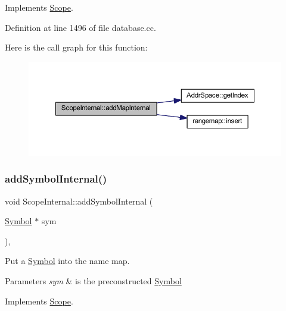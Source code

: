 Implements \mbox{\hyperlink{class_scope_aec0451f131ea214a174e00a434be36e9}{Scope}}.



Definition at line 1496 of file database.\+cc.

Here is the call graph for this function\+:
\nopagebreak
\begin{figure}[H]
\begin{center}
\leavevmode
\includegraphics[width=350pt]{class_scope_internal_a3b6e20fcb0624056020f2fc20d0a06ee_cgraph}
\end{center}
\end{figure}
\mbox{\label{class_scope_internal_af252bcb614abeea3af1750442087304a}} 
\subsubsection{\texorpdfstring{addSymbolInternal()}{addSymbolInternal()}}
{\footnotesize\ttfamily void Scope\+Internal\+::add\+Symbol\+Internal (\begin{DoxyParamCaption}\item[{\mbox{\hyperlink{class_symbol}{Symbol}} $\ast$}]{sym }\end{DoxyParamCaption})\hspace{0.3cm}{\ttfamily [protected]}, {\ttfamily [virtual]}}



Put a \mbox{\hyperlink{class_symbol}{Symbol}} into the name map. 


\begin{DoxyParams}{Parameters}
{\em sym} & is the preconstructed \mbox{\hyperlink{class_symbol}{Symbol}} \\
\hline
\end{DoxyParams}


Implements \mbox{\hyperlink{class_scope_a66d3198f4bd28cf9e8a2a6bc00d065d8}{Scope}}.



